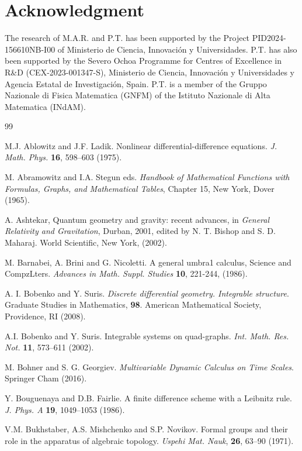 \documentclass[10pt]{amsart}
\numberwithin{equation}{section}
\theoremstyle{definition}
\begin{document}
\section*{Acknowledgment}
The research of M.A.R. and P.T. has been supported by the Project PID2024-156610NB-I00
of Ministerio de Ciencia, Innovaci\'on y Universidades. P.T. has also
been supported by the Severo Ochoa Programme for Centres of Excellence in R\&D   (CEX-2023-001347-S), Ministerio de Ciencia, Innovaci\'{o}n y Universidades y Agencia Estatal de Investigaci\'on, Spain. P.T. is a member of the Gruppo
Nazionale di Fisica Matematica (GNFM) of the Istituto Nazionale di Alta
Matematica (INdAM).
 



\begin{thebibliography}{99}


 M.J. Ablowitz and J.F. Ladik. Nonlinear differential-difference equations. \textit{J. Math. Phys.} \textbf{16}, 598--603 (1975).

 M. Abramowitz and I.A. Stegun eds.  \textit{Handbook of Mathematical Functions with Formulas, Graphs, and Mathematical Tables}, Chapter 15, New York, Dover (1965).

 A. Ashtekar, Quantum geometry and gravity: recent advances, in \textit{General Relativity and Gravitation}, Durban, 2001, edited by N. T. Bishop and S. D. Maharaj. World Scientific, New York, (2002).

 M. Barnabei, A. Brini and G. Nicoletti. A general umbra1 calculus, Science and CompzLters. \textit{Advances in Math. Suppl. Studies} \textbf{10}, 221-244, (1986). 

 A. I. Bobenko and Y. Suris. \textit{Discrete differential geometry. Integrable structure}. Graduate Studies in Mathematics, \textbf{98}. American Mathematical Society, Providence, RI (2008).

 A.I. Bobenko and Y. Suris. Integrable systems on quad-graphs. \textit{Int. Math. Res. Not.} \textbf{11}, 573--611 (2002).

 M. Bohner and S. G. Georgiev. \textit{Multivariable Dynamic Calculus on Time Scales}.  Springer Cham (2016).

 Y. Bouguenaya and D.B. Fairlie. A finite difference scheme with a Leibnitz rule. \textit{J. Phys. A} \textbf{19}, 1049--1053 (1986).

 V.M. Bukhstaber, A.S. Mishchenko and S.P. Novikov. Formal groups and their role in the apparatus of algebraic topology. \textit{Uspehi Mat. Nauk}, \textbf{26},  63--90  (1971).


\end{thebibliography}
\end{document}
